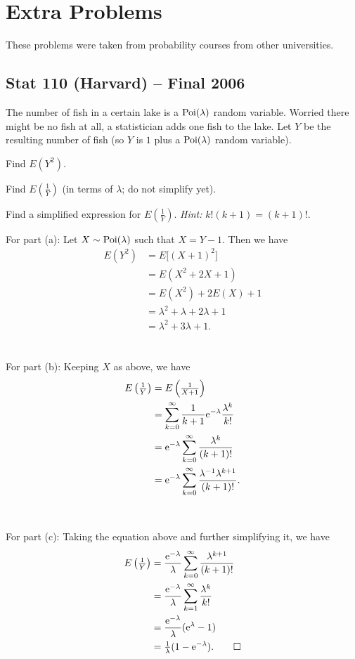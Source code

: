 \section{Extra Problems}
These problems were taken from probability courses from other
universities.
\subsection{Stat 110 (Harvard) -- Final 2006}
\begin{problem}
  The number of fish in a certain lake is a \(\operatorname{Poi}(\lambda)\) random
  variable. Worried there might be no fish at all, a statistician adds one
  fish to the lake. Let \(Y\) be the resulting number of fish (so \(Y\) is
  \(1\) plus a \(\operatorname{Poi}(\lambda)\) random variable).
  \begin{alphlist}
  \item Find \(E(Y^2)\).
  \item Find \(E(\frac{1}{Y})\) (in terms of \(\lambda\); do not simplify
    yet).
  \item Find a simplified expression for \(E(\frac{1}{Y})\). \emph{Hint:}
    \(k!(k+1)=(k+1)!\).
  \end{alphlist}
\end{problem}
\begin{solution*}
  For part (a): Let \(X\sim\operatorname{Poi}(\lambda)\) such that \(X=Y-1\). Then we
  have
  \begin{align*}
    E(Y^2)
    &=E\bigl[(X+1)^2\bigr]\\
    &=E(X^2+2X+1)\\
    &=E(X^2)+2E(X)+1\\
    &=\lambda^2+\lambda+2\lambda+1\\
    &=\lambda^2+3\lambda+1.
  \end{align*}
  \\\\
  For part (b): Keeping \(X\) as above, we have
  \begin{align*}
    E\left(\tfrac{1}{Y}\right)
    &=E\left(\tfrac{1}{X+1}\right)\\
    &=\sum_{k=0}^\infty \frac{1}{k+1}\mathrm{e}^{-\lambda}\frac{\lambda^k}{k!}\\
    &=\mathrm{e}^{-\lambda}\sum_{k=0}^\infty\frac{\lambda^k}{(k+1)!}\\
    &=\mathrm{e}^{-\lambda}\sum_{k=0}^\infty\frac{\lambda^{-1}\lambda^{k+1}}{(k+1)!}.
  \end{align*}
  \\\\
  For part (c): Taking the equation above and further simplifying it, we
  have
  \begin{align*}
    E\left( \tfrac{1}{Y} \right)
    &=\frac{\mathrm{e}^{-\lambda}}{\lambda}
      \sum_{k=0}^\infty\frac{\lambda^{k+1}}{(k+1)!}\\
    &=\frac{\mathrm{e}^{-\lambda}}{\lambda}
      \sum_{k=1}^\infty\frac{\lambda^k}{k!}\\
    &=\frac{\mathrm{e}^{-\lambda}}{\lambda}(\mathrm{e}^{\lambda}-1)\\
    &=\tfrac{1}{\lambda}(1-\mathrm{e}^{-\lambda}).\qedhere
  \end{align*}
\end{solution*}


